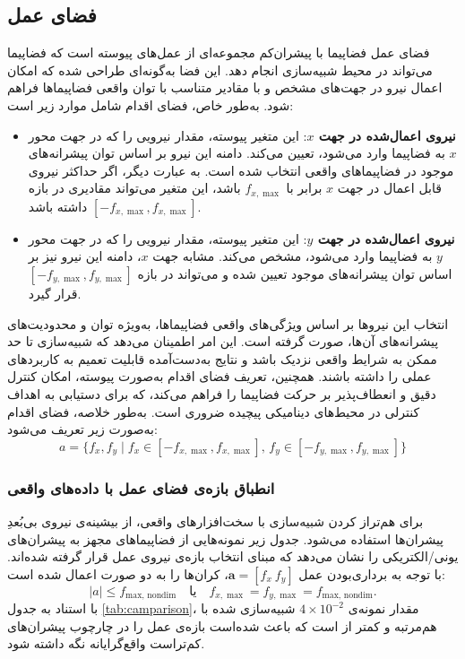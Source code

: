 \subsection{فضای عمل }



فضای عمل 
فضاپیما با پیشران‌کم
مجموعه‌ای از عمل‌های پیوسته است که فضاپیما می‌تواند در محیط شبیه‌سازی انجام دهد. این فضا به‌گونه‌ای طراحی شده که امکان اعمال نیرو در جهت‌های مشخص و با مقادیر متناسب با توان واقعی فضاپیماها فراهم شود. به‌طور خاص، فضای اقدام شامل موارد زیر است:

\begin{itemize}
	\item \textbf{نیروی اعمال‌شده در جهت \( x \)}: این متغیر پیوسته، مقدار نیرویی را که در جهت محور \( x \) به فضاپیما وارد می‌شود، تعیین می‌کند. دامنه این نیرو بر اساس توان پیشرانه‌های موجود در فضاپیماهای واقعی انتخاب شده است. به عبارت دیگر، اگر حداکثر نیروی قابل اعمال در جهت \( x \) برابر با \( f_{x,\max} \) باشد، این متغیر می‌تواند مقادیری در بازه \( [-f_{x,\max}, f_{x,\max}] \) داشته باشد.
	
	\item \textbf{نیروی اعمال‌شده در جهت \( y \)}: این متغیر پیوسته، مقدار نیرویی را که در جهت محور \( y \) به فضاپیما وارد می‌شود، مشخص می‌کند. مشابه جهت \( x \)، دامنه این نیرو نیز بر اساس توان پیشرانه‌های موجود تعیین شده و می‌تواند در بازه \( [-f_{y,\max}, f_{y,\max}] \) قرار گیرد.
\end{itemize}

انتخاب این نیروها بر اساس ویژگی‌های واقعی فضاپیماها، به‌ویژه توان و محدودیت‌های پیشرانه‌های آن‌ها، صورت گرفته است. این امر اطمینان می‌دهد که شبیه‌سازی تا حد ممکن به شرایط واقعی نزدیک باشد و نتایج به‌دست‌آمده قابلیت تعمیم به کاربردهای عملی را داشته باشند. همچنین، تعریف فضای اقدام به‌صورت پیوسته، امکان کنترل دقیق و انعطاف‌پذیر بر حرکت فضاپیما را فراهم می‌کند، که برای دستیابی به اهداف کنترلی در محیط‌های دینامیکی پیچیده ضروری است.
به‌طور خلاصه، فضای اقدام به‌صورت زیر تعریف می‌شود:
\[
a = \{ f_x, f_y \mid f_x \in [-f_{x,\max}, f_{x,\max}], \, f_y \in [-f_{y,\max}, f_{y,\max}] \}
\]

\subsubsection*{انطباق بازه‌ی فضای عمل با داده‌های واقعی}
برای هم‌تراز کردن شبیه‌سازی با سخت‌افزارهای واقعی، از بیشینه‌ی نیروی بی‌بُعدِ پیشران‌ها استفاده می‌شود. جدول زیر نمونه‌هایی از فضاپیماهای مجهز به پیشران‌های یونی/الکتریکی را نشان می‌دهد که مبنای انتخاب بازه‌ی نیروی عمل قرار گرفته شده‌اند. با توجه به برداری‌بودن عمل
$\boldsymbol{a}=[
f_x ~  f_y
]$،
کران‌ها را به دو صورت اعمال شده است:
\[
|a| \le f_{\text{max, nondim}}
\quad \text{یا} \quad
f_{x,\max}=f_{y,\max}=f_{\text{max, nondim}}.
\]
با استناد به جدول
\ref{tab:camparison}،
مقدار نمونه‌ی \(4{\times}10^{-2}\) شبیه‌سازی شده با  هم‌مرتبه و کمتر از  است که باعث شده‌است بازه‌ی عمل را در چارچوب پیشران‌های کم‌تراست واقع‌گرایانه نگه داشته شود.


